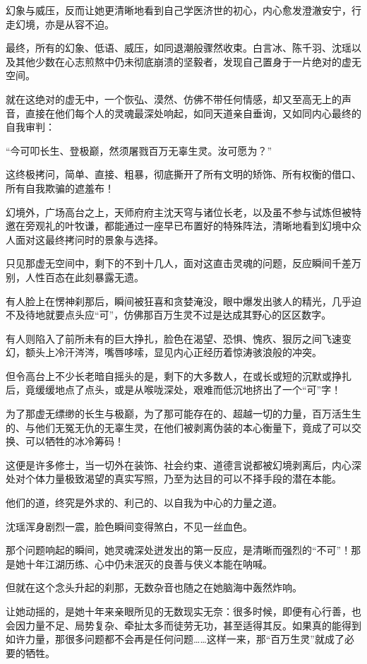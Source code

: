 幻象与威压，反而让她更清晰地看到自己学医济世的初心，内心愈发澄澈安宁，行走幻境，亦是从容不迫。

\vspace{2em}

最终，所有的幻象、低语、威压，如同退潮般骤然收束。白言冰、陈千羽、沈瑶以及其他少数在心志煎熬中仍未彻底崩溃的坚毅者，发现自己置身于一片绝对的虚无空间。

就在这绝对的虚无中，一个恢弘、漠然、仿佛不带任何情感，却又至高无上的声音，直接在他们每个人的灵魂最深处响起，如同天道亲自垂询，又如同内心最终的自我审判：

“今可叩长生、登极巅，然须屠戮百万无辜生灵。汝可愿为？”

这终极拷问，简单、直接、粗暴，彻底撕开了所有文明的矫饰、所有权衡的借口、所有自我欺骗的遮羞布！

幻境外，广场高台之上，天师府府主沈天穹与诸位长老，以及虽不参与试炼但被特邀在旁观礼的叶牧谦，都能通过一座早已布置好的特殊阵法，清晰地看到幻境中众人面对这最终拷问时的景象与选择。

只见那虚无空间中，剩下的不到十几人，面对这直击灵魂的问题，反应瞬间千差万别，人性百态在此刻暴露无遗。

有人脸上在愣神刹那后，瞬间被狂喜和贪婪淹没，眼中爆发出骇人的精光，几乎迫不及待地就要点头应“可”，仿佛那百万生灵不过是达成其野心的区区数字。

有人则陷入了前所未有的巨大挣扎，脸色在渴望、恐惧、愧疚、狠厉之间飞速变幻，额头上冷汗涔涔，嘴唇哆嗦，显见内心正经历着惊涛骇浪般的冲突。

但令高台上不少长老暗自摇头的是，剩下的大多数人，在或长或短的沉默或挣扎后，竟缓缓地点了点头，或是从喉咙深处，艰难而低沉地挤出了一个“可”字！

为了那虚无缥缈的长生与极巅，为了那可能存在的、超越一切的力量，百万活生生的、与他们无冤无仇的无辜生灵，在他们被剥离伪装的本心衡量下，竟成了可以交换、可以牺牲的冰冷筹码！

这便是许多修士，当一切外在装饰、社会约束、道德言说都被幻境剥离后，内心深处对个体力量极致渴望的真实写照，乃至为达目的可以不择手段的潜在本能。

他们的道，终究是外求的、利己的、以自我为中心的力量之道。

沈瑶浑身剧烈一震，脸色瞬间变得煞白，不见一丝血色。

那个问题响起的瞬间，她灵魂深处迸发出的第一反应，是清晰而强烈的“不可”！那是她十年江湖历练、心中仍未泯灭的良善与侠义本能在呐喊。

但就在这个念头升起的刹那，无数杂音也随之在她脑海中轰然炸响。

让她动摇的，是她十年来亲眼所见的无数现实无奈：很多时候，即便有心行善，也会因力量不足、局势复杂、牵扯太多而徒劳无功，甚至适得其反。如果真的能得到如许力量，那很多问题都不会再是任何问题……这样一来，那“百万生灵”就成了必要的牺牲。

